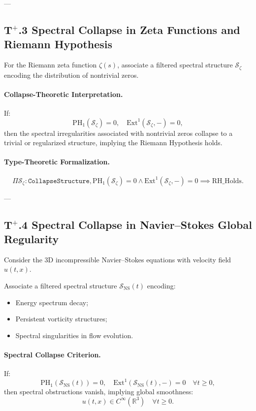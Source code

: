 \documentclass[11pt]{article}
\begin{document}
---

\subsection*{T$^{+}$.3 Spectral Collapse in Zeta Functions and Riemann Hypothesis}

For the Riemann zeta function $\zeta(s)$, associate a filtered spectral structure $\mathcal{S}_{\zeta}$ encoding the distribution of nontrivial zeros.

\paragraph{Collapse-Theoretic Interpretation.}
If:
\[
\mathrm{PH}_1(\mathcal{S}_{\zeta}) = 0, \quad \mathrm{Ext}^1(\mathcal{S}_{\zeta}, -) = 0,
\]
then the spectral irregularities associated with nontrivial zeros collapse to a trivial or regularized structure, implying the Riemann Hypothesis holds.

\paragraph{Type-Theoretic Formalization.}
\[
\Pi \mathcal{S}_{\zeta} : \texttt{CollapseStructure},
\mathrm{PH}_1(\mathcal{S}_{\zeta}) = 0 \wedge \mathrm{Ext}^1(\mathcal{S}_{\zeta}, -) = 0 \implies \mathrm{RH\_Holds}.
\]

---

\subsection*{T$^{+}$.4 Spectral Collapse in Navier--Stokes Global Regularity}

Consider the 3D incompressible Navier--Stokes equations with velocity field $u(t, x)$.

Associate a filtered spectral structure $\mathcal{S}_{\mathrm{NS}}(t)$ encoding:
\begin{itemize}
    \item Energy spectrum decay;
    \item Persistent vorticity structures;
    \item Spectral singularities in flow evolution.
\end{itemize}

\paragraph{Spectral Collapse Criterion.}
If:
\[
\mathrm{PH}_1(\mathcal{S}_{\mathrm{NS}}(t)) = 0, \quad \mathrm{Ext}^1(\mathcal{S}_{\mathrm{NS}}(t), -) = 0 \quad \forall t \geq 0,
\]
then spectral obstructions vanish, implying global smoothness:
\[
 u(t, x) \in C^{\infty}(\mathbb{R}^3) \quad \forall t \geq 0.
\]
\end{document}
